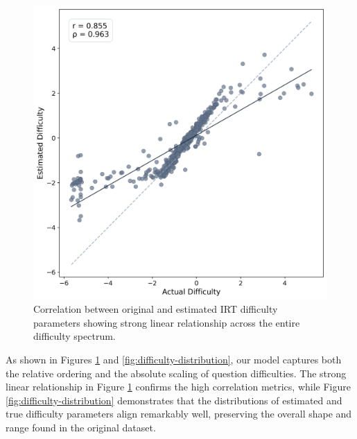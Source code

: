\documentclass[
    a4paper, %
    10pt, %
    twoside, %
]{LTJournalArticle}
\begin{document}
\begin{figure}[H]
    \centering
    \includegraphics[width=1\columnwidth]{../one_model_experiment/figures/difficulty_comparison.png}
    \caption{Correlation between original and estimated IRT difficulty parameters showing strong linear relationship across the entire difficulty spectrum.}
    \label{fig:difficulty-correlation}
\end{figure}

As shown in Figures \ref{fig:difficulty-correlation} and \ref{fig:difficulty-distribution}, our model captures both the relative ordering and the absolute scaling of question difficulties. The strong linear relationship in Figure \ref{fig:difficulty-correlation} confirms the high correlation metrics, while Figure \ref{fig:difficulty-distribution} demonstrates that the distributions of estimated and true difficulty parameters align remarkably well, preserving the overall shape and range found in the original dataset.
\end{document}
